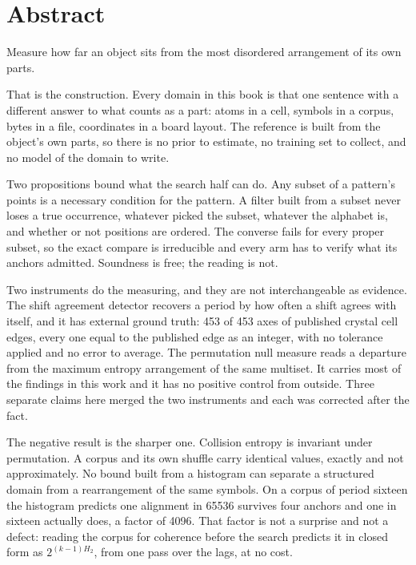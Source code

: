 \chapter*{Abstract}

Measure how far an object sits from the most disordered arrangement of its own parts.

That is the construction. Every domain in this book is that one sentence with a different answer to
what counts as a part: atoms in a cell, symbols in a corpus, bytes in a file, coordinates in a board
layout. The reference is built from the object's own parts, so there is no prior to estimate, no
training set to collect, and no model of the domain to write.

Two propositions bound what the search half can do. Any subset of a pattern's points is a necessary
condition for the pattern. A filter built from a subset never loses a true occurrence, whatever
picked the subset, whatever the alphabet is, and whether or not positions are ordered. The converse fails for every proper subset, so the exact compare is irreducible and every
arm has to verify what its anchors admitted. Soundness is free; the reading is not.

Two instruments do the measuring, and they are not interchangeable as evidence. The shift agreement
detector recovers a period by how often a shift agrees with itself, and it has external ground
truth: 453 of 453 axes of published crystal cell edges, every one equal to the published edge as an
integer, with no tolerance applied and no error to average. The permutation null measure reads a
departure from the maximum
entropy arrangement of the same multiset. It carries most of the findings in this work and it has no
positive control from outside. Three separate claims here merged the two instruments and each was
corrected after the fact.

The negative result is the sharper one. Collision entropy is invariant under permutation. A
corpus and its own shuffle carry identical values, exactly and not approximately. No bound built
from a histogram can separate a structured domain from a rearrangement of the same symbols. On a
corpus of period sixteen the histogram predicts one alignment in 65536 survives four anchors and one
in sixteen actually does, a factor of 4096. That factor is not a surprise and not a defect: reading
the corpus for coherence before the search predicts it in closed form as $2^{(k-1)H_2}$, from one
pass over the lags, at no cost.


